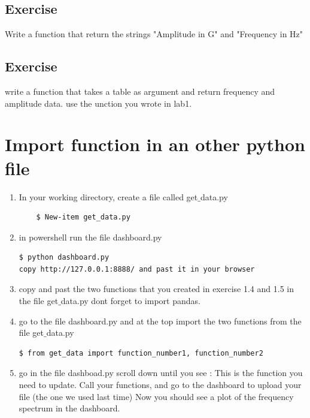 \documentclass[10pt,a4paper,titlepage]{article}
\begin{document}
\subsection{Exercise}
Write a function that return the strings "Amplitude in G" and "Frequency in Hz"
\subsection{Exercise}
write a function that takes a table as argument and return frequency and amplitude data.
use the unction you wrote in lab1.

\section{Import function in an other python file}
\begin{enumerate}
	\item In your working directory, create a file called get$\_$data.py
	\begin{lstlisting}
	$ New-item get_data.py
	\end{lstlisting}
	\item in powershell run the file dashboard.py
\begin{lstlisting}
$ python dashboard.py
copy http://127.0.0.1:8888/ and past it in your browser
\end{lstlisting}

\item copy and past the two functions that you created in exercise 1.4 and 1.5 in the file get$\_$data.py
dont forget to import pandas.
\item go to the file dashboard.py and at the top import the two functions from the file get$\_$data.py
\begin{lstlisting}
$ from get_data import function_number1, function_number2
\end{lstlisting}
\item go in the file dashboad.py scroll down until you see : This is the function you need to update.
Call your functions, and go to the dashboard to upload your file (the one we used last time)
Now you should see a plot of the frequency spectrum in the dashboard.
\end{enumerate}
\end{document}
